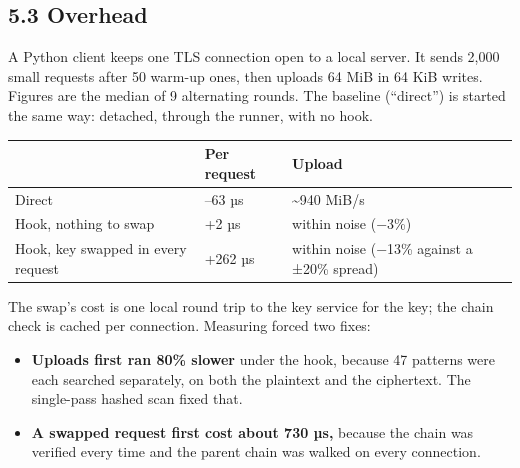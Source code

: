 \documentclass[
  11pt]{article}
\newcounter{none} %
\providecommand{\tightlist}{%
  \setlength{\itemsep}{0pt}\setlength{\parskip}{0pt}}
\begin{document}
\subsection*{5.3
Overhead}\label{overhead}

A Python client keeps one TLS connection
open to a local server. It sends 2,000
small requests after 50 warm-up ones,
then uploads 64 MiB in 64 KiB writes.
Figures are the median of 9 alternating
rounds. The baseline (``direct'') is
started the same way: detached, through
the runner, with no hook.

{\def\LTcaptype{none} %
\begin{longtable}[]{@{}
  >{\raggedright\arraybackslash}p{}
  >{\raggedright\arraybackslash}p{}
  >{\raggedright\arraybackslash}p{}@{}}
\toprule\noalign{}
\begin{minipage}[b]{\linewidth}\raggedright
\end{minipage} &
\begin{minipage}[b]{\linewidth}\raggedright
Per request
\end{minipage} &
\begin{minipage}[b]{\linewidth}\raggedright
Upload
\end{minipage} \\
\midrule\noalign{}
\endhead
\bottomrule\noalign{}
\endlastfoot
Direct & 61--63 µs & \textasciitilde940
MiB/s \\
Hook, nothing to swap & +2 µs & within
noise (−3\%) \\
Hook, key swapped in every request &
+262 µs & within noise (−13\% against a
±20\% spread) \\
\end{longtable}
}

The swap's cost is one local round trip
to the key service for the key; the
chain check is cached per connection.
Measuring forced two fixes:

\begin{itemize}
\tightlist
\item
  \textbf{Uploads first ran 80\% slower}
  under the hook, because 47 patterns
  were each searched separately, on both
  the plaintext and the ciphertext. The
  single-pass hashed scan fixed that.
\item
  \textbf{A swapped request first cost
  about 730 µs,} because the chain was
  verified every time and the parent
  chain was walked on every connection.
\end{itemize}
\end{document}
